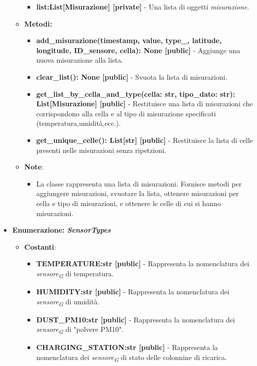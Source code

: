 \begin{itemize}
\begin{itemize}
\begin{itemize}
        \item \textbf{list:List[Misurazione] [private]} - Una lista di oggetti \textit{misurazione}.
    \end{itemize}
    \item \textbf{Metodi: }
    \begin{itemize}
        \item \textbf{add\_misurazione(timestamp, value, type\_, latitude, longitude, ID\_sensore, cella): None [public]} - Aggiunge una nuova misurazione alla lista.
        \item \textbf{clear\_list(): None [public]} - Svuota la lista di misurazioni.
        \item \textbf{get\_list\_by\_cella\_and\_type(cella: str, tipo\_dato: str): List[Misurazione] [public]} - Restituisce una lista di misurazioni che corrispondono alla cella e al tipo di misurazione specificati (temperatura,umidità,ecc.).
        \item \textbf{get\_unique\_celle(): List[str] [public]} - Restituisce la lista di celle presenti nelle misurazioni senza ripetzioni.
    \end{itemize}
    \item\textbf{Note}:
        \begin{itemize}
            \item La classe rappresenta una lista di misurazioni. Fornisce metodi per aggiungere misurazioni, svuotare la lista, ottenere misurazioni per cella e tipo di misurazioni, e ottenere le celle di cui si hanno misurazioni.
        \end{itemize}
    \end{itemize}
    \item\textbf{Enumerazione: \textit{SensorTypes}}
        \begin{itemize}
            \item \textbf{Costanti}: 
            \begin{itemize}
                \item \textbf{TEMPERATURE:str [public]} - Rappresenta la nomenclatura dei \textit{sensore}\textsubscript{\textit{G}} di temperatura.
                \item \textbf{HUMIDITY:str [public]} - Rappresenta la nomenclatura dei \textit{sensore}\textsubscript{\textit{G}} di umidità.
                \item \textbf{DUST\_PM10:str [public]} - Rappresenta la nomenclatura dei \textit{sensore}\textsubscript{\textit{G}} di "polvere PM10".
                \item \textbf{CHARGING\_STATION:str [public]} - Rappresenta la nomenclatura dei \textit{sensore}\textsubscript{\textit{G}} di stato delle colonnine di ricarica.

\end{itemize}
\end{itemize}
\end{itemize}

